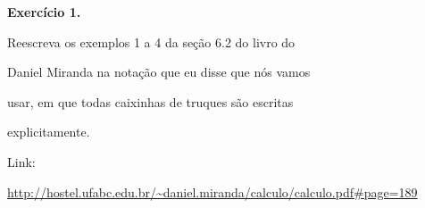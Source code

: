 \documentclass[oneside,12pt]{article}
\begin{document}
\newpage

{\bf Exercício 1.}

Reescreva os exemplos 1 a 4 da seção 6.2 do livro do

Daniel Miranda na notação que eu disse que nós vamos

usar, em que todas caixinhas de truques são escritas

explicitamente.

\msk

Link:

\ssk

{\scriptsize

\url{http://hostel.ufabc.edu.br/~daniel.miranda/calculo/calculo.pdf\#page=189}

}


% 
% 
% 








\end{document}
